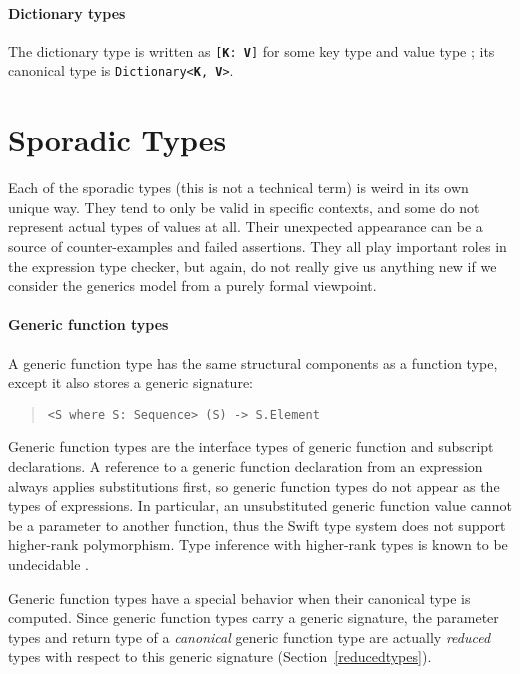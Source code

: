 \documentclass[../generics]{subfiles}
\begin{document}
\paragraph{Dictionary types} The dictionary type is written as \texttt{[\textbf{K}: \textbf{V}]} for some key type  and value type ; its canonical type is \texttt{Dictionary<\textbf{K}, \textbf{V}>}.

\section{Sporadic Types}\label{misc types}

Each of the sporadic types (this is not a technical term) is weird in its own unique way. They tend to only be valid in specific contexts, and some do not represent actual types of values at all. Their unexpected appearance can be a source of counter-examples and failed assertions. They all play important roles in the expression type checker, but again, do not really give us anything new if we consider the generics model from a purely formal viewpoint.

\paragraph{Generic function types}
A generic function type has the same structural components as a function type, except it also stores a generic signature:
\begin{quote}
\begin{verbatim}
<S where S: Sequence> (S) -> S.Element
\end{verbatim}
\end{quote}

Generic function types are the interface types of generic function and subscript declarations. A reference to a generic function declaration from an expression always applies substitutions first, so generic function types do not appear as the types of expressions. In particular, an unsubstituted generic function value cannot be a parameter to another function, thus the Swift type system does not support higher-rank polymorphism. Type inference with higher-rank types is known to be undecidable \cite{wells}.

Generic function types have a special behavior when their canonical type is computed. Since generic function types carry a generic signature, the parameter types and return type of a \emph{canonical} generic function type are actually \emph{reduced} types with respect to this generic signature (Section~\ref{reducedtypes}).
\end{document}
